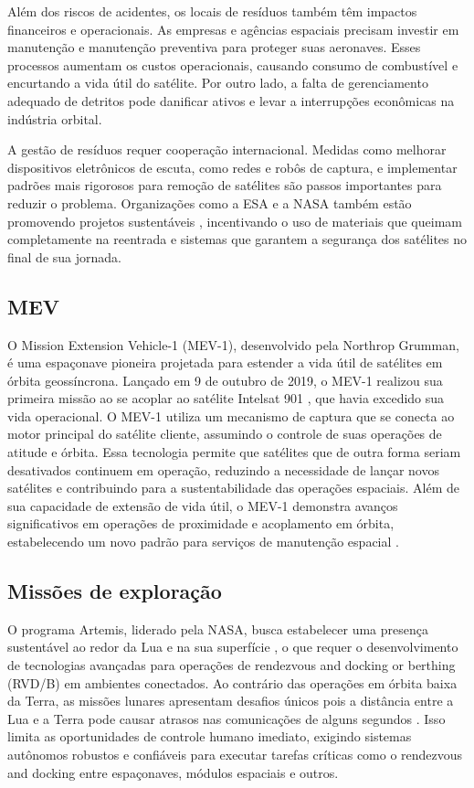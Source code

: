Além dos riscos de acidentes, os locais de resíduos também têm impactos financeiros e operacionais. As empresas e agências espaciais precisam investir em manutenção e manutenção preventiva para proteger suas aeronaves. Esses processos aumentam os custos operacionais, causando consumo de combustível e encurtando a vida útil do satélite. Por outro lado, a falta de gerenciamento adequado de detritos pode danificar ativos e levar a interrupções econômicas na indústria orbital.

A gestão de resíduos requer cooperação internacional. Medidas como melhorar dispositivos eletrônicos de escuta, como redes e robôs de captura, e implementar padrões mais rigorosos para remoção de satélites são passos importantes para reduzir o problema. Organizações como a ESA e a NASA também estão promovendo projetos sustentáveis \citep{esaDebrisMitigation2023}, incentivando o uso de materiais que queimam completamente na reentrada e sistemas que garantem a segurança dos satélites no final de sua jornada.

\subsection{MEV}

O Mission Extension Vehicle-1 (MEV-1), desenvolvido pela Northrop Grumman, é uma espaçonave pioneira projetada para estender a vida útil de satélites em órbita geossíncrona. Lançado em 9 de outubro de 2019, o MEV-1 realizou sua primeira missão ao se acoplar ao satélite Intelsat 901 \citep{nytMEV1}, que havia excedido sua vida operacional. O MEV-1 utiliza um mecanismo de captura que se conecta ao motor principal do satélite cliente, assumindo o controle de suas operações de atitude e órbita. Essa tecnologia permite que satélites que de outra forma seriam desativados continuem em operação, reduzindo a necessidade de lançar novos satélites e contribuindo para a sustentabilidade das operações espaciais. Além de sua capacidade de extensão de vida útil, o MEV-1 demonstra avanços significativos em operações de proximidade e acoplamento em órbita, estabelecendo um novo padrão para serviços de manutenção espacial \citep{mev1}.

\subsection{Missões de exploração}

O programa Artemis, liderado pela NASA, busca estabelecer uma presença sustentável ao redor da Lua e na sua superfície \citep{nasaArtemis}, o que requer o desenvolvimento de tecnologias avançadas para operações de rendezvous and docking or berthing (RVD/B) em ambientes conectados. Ao contrário das operações em órbita baixa da Terra, as missões lunares apresentam desafios únicos pois a distância entre a Lua e a Terra pode causar atrasos nas comunicações de alguns segundos \citep{keeports2006}. Isso limita as oportunidades de controle humano imediato, exigindo sistemas autônomos robustos e confiáveis para executar tarefas críticas como o rendezvous and docking entre espaçonaves, módulos espaciais e outros.

